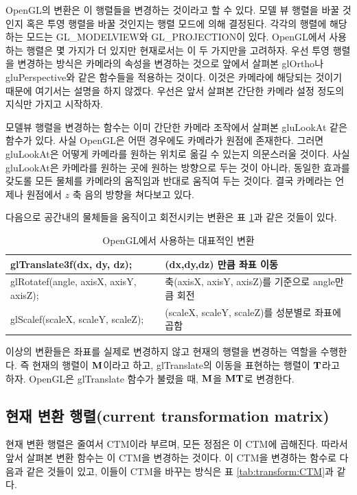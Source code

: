 OpenGL의 변환은 이 행렬들을 변경하는 것이라고 할 수 있다. 모델 뷰 행렬을 바꿀 것인지 혹은 투영 행렬을 바꿀 것인지는 행렬 모드에 의해 결정된다. 각각의 행렬에 해당하는 모드는 {\sf GL\_MODELVIEW}와 {\sf GL\_PROJECTION}이 있다. OpenGL에서 사용하는 행렬은 몇 가지가 더 있지만 현재로서는 이 두 가지만을 고려하자.
우선 투영 행렬을 변경하는 방식은 카메라의 속성을 변경하는 것으로 앞에서 살펴본 {\sf glOrtho}나 {\sf gluPerspective}와 같은 함수들을 적용하는 것이다. 이것은 카메라에 해당되는 것이기 때문에 여기서는 설명을 하지 않겠다. 우선은 앞서 살펴본 간단한 카메라 설정 정도의 지식만 가지고 시작하자.

모델뷰 행렬을 변경하는 함수는 이미 간단한 카메라 조작에서 살펴본 {\sf gluLookAt} 같은 함수가 있다. 사실 OpenGL은 어떤 경우에도 카메라가 원점에 존재한다. 그러면 {\sf gluLookAt}은 어떻게 카메라를 원하는 위치로 옮길 수 있는지 의문스러울 것이다. 사실 {\sf gluLookAt}은 카메라를 원하는 곳에 원하는 방향으로 두는 것이 아니라, 동일한 효과를 갖도롤 모든 물체를 카메라의 움직임과 반대로 움직여 두는 것이다. 결국 카메라는 언제나 원점에서 $z$ 축 음의 방향을 쳐다보고 있다.

다음으로 공간내의 물체들을 움직이고 회전시키는 변환은 표 \ref{tab:transform:OpenGLXforms}과 같은 것들이 있다.

\begin{table}
\caption{OpenGL에서 사용하는 대표적인 변환}
\label{tab:transform:OpenGLXforms}
\begin{center}
    \begin{tabular}{ |l| p{8cm} |}
    \hline
    {\small \sf glTranslate3f(dx, dy, dz);} & {\small \sf (dx,dy,dz) 만큼 좌표 이동} \\ \hline
    {\small \sf glRotatef(angle, axisX, axisY, axisZ);} & {\small \sf 축(axisX, axisY, axisZ)를 기준으로 angle만큼 회전}\\ \hline
    {\small \sf glScalef(scaleX, scaleY, scaleZ);} & {\small \sf  (scaleX, scaleY, scaleZ)를 성분별로 좌표에 곱함}\\ \hline
    \hline
    \end{tabular}
\end{center}
\end{table}
이상의 변환들은 좌표를 실제로 변경하지 않고 현재의 행렬을 변경하는 역할을 수행한다. 즉 현재의 행렬이 $\bf M$이라고 하고, {\sf glTranslate}의 이동을 표현하는 행렬이 $\bf T$라고 하자. OpenGL은 {\sf glTranslate} 함수가 불렸을 때, $\bf M$을 $\bf MT$로 변경한다. 

\subsection{현재 변환 행렬(current transformation matrix)}
현재 변환 행렬은 줄여서 CTM이라 부르며, 모든 정점은 이 CTM에 곱해진다. 따라서 앞서 살펴본 변환 함수는 이 CTM을 변경하는 것이다.
이 CTM을 변경하는 함수로 다음과 같은 것들이 있고, 이들이 CTM을 바꾸는 방식은 표 \ref{tab:transform:CTM}과 같다.\\



